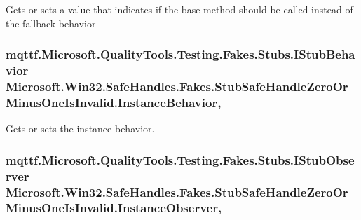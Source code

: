 Gets or sets a value that indicates if the base method should be called instead of the fallback behavior

\hypertarget{class_microsoft_1_1_win32_1_1_safe_handles_1_1_fakes_1_1_stub_safe_handle_zero_or_minus_one_is_invalid_a4701567d3ac3e76024b550f1c4b31f47}{
\subsubsection[{Instance\-Behavior}]{\setlength{\rightskip}{0pt plus 5cm}mqttf.\-Microsoft.\-Quality\-Tools.\-Testing.\-Fakes.\-Stubs.\-I\-Stub\-Behavior Microsoft.\-Win32.\-Safe\-Handles.\-Fakes.\-Stub\-Safe\-Handle\-Zero\-Or\-Minus\-One\-Is\-Invalid.\-Instance\-Behavior\hspace{0.3cm}{\ttfamily [get]}, {\ttfamily [set]}}}\label{class_microsoft_1_1_win32_1_1_safe_handles_1_1_fakes_1_1_stub_safe_handle_zero_or_minus_one_is_invalid_a4701567d3ac3e76024b550f1c4b31f47}


Gets or sets the instance behavior.

\hypertarget{class_microsoft_1_1_win32_1_1_safe_handles_1_1_fakes_1_1_stub_safe_handle_zero_or_minus_one_is_invalid_a546e872b20dc59d56bff76140c5a5a3b}{
\subsubsection[{Instance\-Observer}]{\setlength{\rightskip}{0pt plus 5cm}mqttf.\-Microsoft.\-Quality\-Tools.\-Testing.\-Fakes.\-Stubs.\-I\-Stub\-Observer Microsoft.\-Win32.\-Safe\-Handles.\-Fakes.\-Stub\-Safe\-Handle\-Zero\-Or\-Minus\-One\-Is\-Invalid.\-Instance\-Observer\hspace{0.3cm}{\ttfamily [get]}, {\ttfamily [set]}}}\label{class_microsoft_1_1_win32_1_1_safe_handles_1_1_fakes_1_1_stub_safe_handle_zero_or_minus_one_is_invalid_a546e872b20dc59d56bff76140c5a5a3b}


